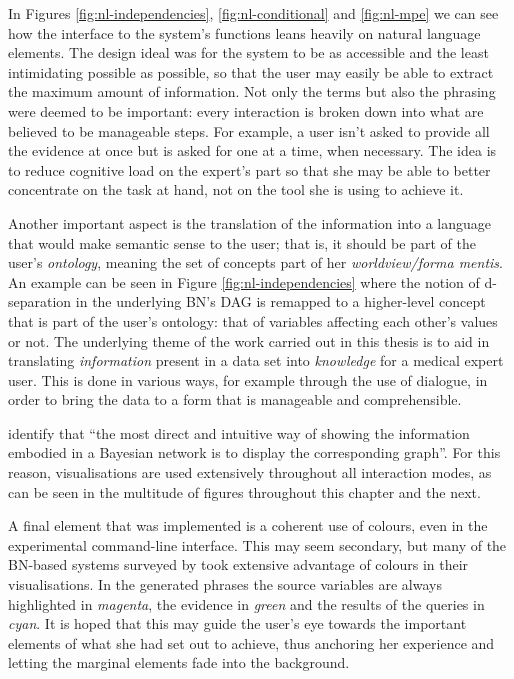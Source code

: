 In Figures \ref{fig:nl-independencies}, \ref{fig:nl-conditional} and \ref{fig:nl-mpe} we can see how the interface to the system's functions leans heavily on natural language elements.
The design ideal was for the system to be as accessible and the least intimidating possible as possible, so that the user may easily be able to extract the maximum amount of information.
Not only the terms but also the phrasing were deemed to be important: every interaction is broken down into what are believed to be manageable steps.
For example, a user isn't asked to provide all the evidence at once but is asked for one at a time, when necessary.
The idea is to reduce cognitive load on the expert's part so that she may be able to better concentrate on the task at hand, not on the tool she is using to achieve it.

Another important aspect is the translation of the information into a language that would make semantic sense to the user; that is, it should be part of the user's \textit{ontology}, meaning the set of concepts part of her \textit{worldview/forma mentis}.
An example can be seen in Figure \ref{fig:nl-independencies} where the notion of d-separation in the underlying BN's DAG is remapped to a higher-level concept that is part of the user's ontology: that of variables affecting each other's values or not.
The underlying theme of the work carried out in this thesis is to aid in translating \textit{information} present in a data set into \textit{knowledge} for a medical expert user.
This is done in various ways, for example through the use of dialogue, in order to bring the data to a form that is manageable and comprehensible.

\citet{lacave2002review} identify that \enquote{the most direct and intuitive way of showing the information embodied in a Bayesian network is to display the corresponding graph}.
For this reason, visualisations are used extensively throughout all interaction modes, as can be seen in the multitude of figures throughout this chapter and the next. 

A final element that was implemented is a coherent use of colours, even in the experimental command-line interface.
This may seem secondary, but many of the BN-based systems surveyed by \citet{lacave2002review} took extensive advantage of colours in their visualisations.
In the generated phrases the source variables are always highlighted in \textit{magenta}, the evidence in \textit{green} and the results of the queries in \textit{cyan}.
It is hoped that this may guide the user's eye towards the important elements of what she had set out to achieve, thus anchoring her experience and letting the marginal elements fade into the background.

